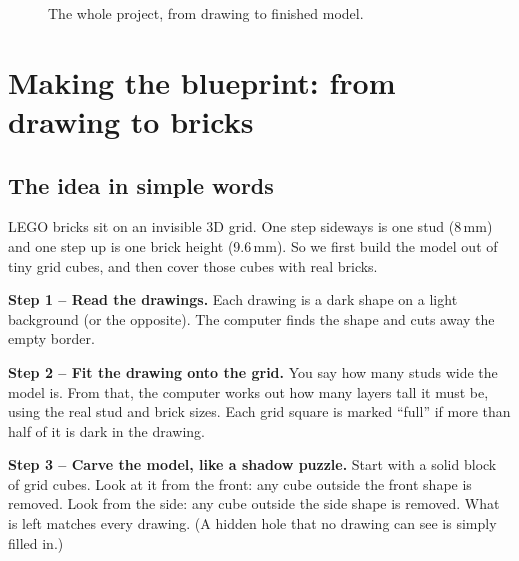 \documentclass[11pt,a4paper]{article}
\begin{document}
\begin{figure}[H]
\centering
{}
\caption{The whole project, from drawing to finished model.}
\end{figure}

\section{Making the blueprint: from drawing to bricks}

\subsection{The idea in simple words}

LEGO bricks sit on an invisible 3D grid. One step sideways is one stud
(8\,mm) and one step up is one brick height (9.6\,mm). So we first build the
model out of tiny grid cubes, and then cover those cubes with real bricks.

\textbf{Step 1 -- Read the drawings.} Each drawing is a dark shape on a light
background (or the opposite). The computer finds the shape and cuts away the
empty border.

\textbf{Step 2 -- Fit the drawing onto the grid.} You say how many studs wide
the model is. From that, the computer works out how many layers tall it must
be, using the real stud and brick sizes. Each grid square is marked ``full'' if
more than half of it is dark in the drawing.

\textbf{Step 3 -- Carve the model, like a shadow puzzle.} Start with a solid
block of grid cubes. Look at it from the front: any cube outside the front
shape is removed. Look from the side: any cube outside the side shape is
removed. What is left matches every drawing. (A hidden hole that no drawing can
see is simply filled in.)
\end{document}

